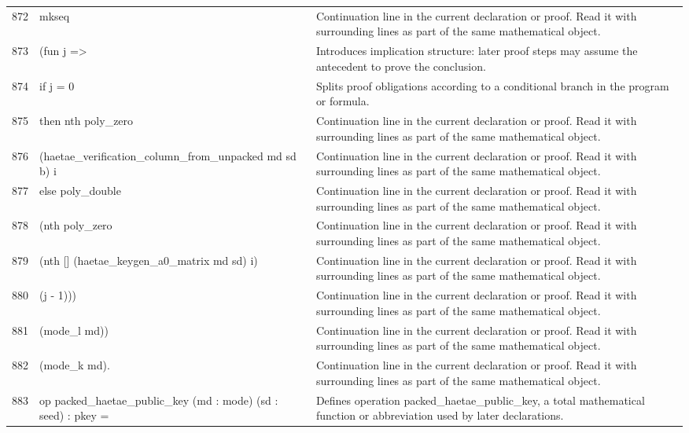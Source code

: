 \documentclass[10pt]{article}
\begin{document}
\begin{longtable}{r L{0.53\textwidth} L{0.37\textwidth}}
872 & {\ttfamily\scriptsize       mkseq} & Continuation line in the current declaration or proof.  Read it with surrounding lines as part of the same mathematical object. \\
873 & {\ttfamily\scriptsize         (fun j =>} & Introduces implication structure: later proof steps may assume the antecedent to prove the conclusion. \\
874 & {\ttfamily\scriptsize           if j = 0} & Splits proof obligations according to a conditional branch in the program or formula. \\
875 & {\ttfamily\scriptsize           then nth poly\_zero} & Continuation line in the current declaration or proof.  Read it with surrounding lines as part of the same mathematical object. \\
876 & {\ttfamily\scriptsize                  (haetae\_verification\_column\_from\_unpacked md sd b) i} & Continuation line in the current declaration or proof.  Read it with surrounding lines as part of the same mathematical object. \\
877 & {\ttfamily\scriptsize           else poly\_double} & Continuation line in the current declaration or proof.  Read it with surrounding lines as part of the same mathematical object. \\
878 & {\ttfamily\scriptsize                  (nth poly\_zero} & Continuation line in the current declaration or proof.  Read it with surrounding lines as part of the same mathematical object. \\
879 & {\ttfamily\scriptsize                    (nth [] (haetae\_keygen\_a0\_matrix md sd) i)} & Continuation line in the current declaration or proof.  Read it with surrounding lines as part of the same mathematical object. \\
880 & {\ttfamily\scriptsize                    (j - 1)))} & Continuation line in the current declaration or proof.  Read it with surrounding lines as part of the same mathematical object. \\
881 & {\ttfamily\scriptsize         (mode\_l md))} & Continuation line in the current declaration or proof.  Read it with surrounding lines as part of the same mathematical object. \\
882 & {\ttfamily\scriptsize     (mode\_k md).} & Continuation line in the current declaration or proof.  Read it with surrounding lines as part of the same mathematical object. \\
883 & {\ttfamily\scriptsize op packed\_haetae\_public\_key (md : mode) (sd : seed) : pkey =} & Defines operation packed\_haetae\_public\_key, a total mathematical function or abbreviation used by later declarations. \\

\end{longtable}
\end{document}
